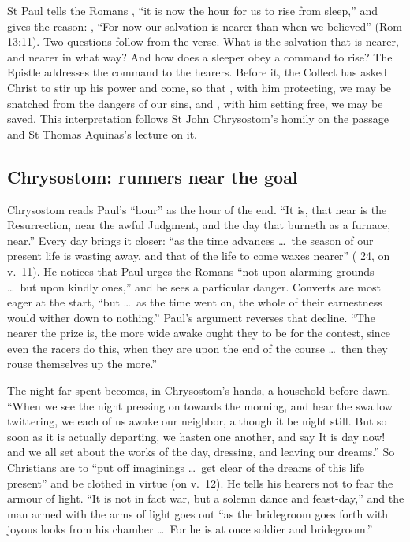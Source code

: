 
St Paul tells the Romans , ``it is
now the hour for us to rise from sleep,'' and gives the reason: , ``For now our salvation
is nearer than when we believed'' (Rom 13:11). Two questions follow from the
verse. What is the salvation that is nearer, and nearer in what way? And how
does a sleeper obey a command to rise? The Epistle addresses the command to
the hearers. Before it, the Collect has asked Christ to stir up his power and
come, so that , with him protecting, we may be snatched
from the dangers of our sins, and , with him setting
free, we may be saved. This interpretation follows St John Chrysostom's
homily on the passage and St Thomas Aquinas's lecture on it.

\subsection{Chrysostom: runners near the goal}

Chrysostom reads Paul's ``hour'' as the hour of the end. ``It is, that near is
the Resurrection, near the awful Judgment, and the day that burneth as a
furnace, near.'' Every day brings it closer: ``as the time advances \dots\ the
season of our present life is wasting away, and that of the life to come
waxes nearer'' ( 24, on v.~11). He notices that Paul
urges the Romans ``not upon alarming grounds \dots\ but upon kindly ones,'' and
he sees a particular danger. Converts are most eager at the start, ``but \dots\
as the time went on, the whole of their earnestness would wither down to
nothing.'' Paul's argument reverses that decline. ``The nearer the prize is,
the more wide awake ought they to be for the contest, since even the racers do
this, when they are upon the end of the course \dots\ then they rouse
themselves up the more.''

The night far spent becomes, in Chrysostom's hands, a household before dawn.
``When we see the night pressing on towards the morning, and hear the swallow
twittering, we each of us awake our neighbor, although it be night still. But
so soon as it is actually departing, we hasten one another, and say It is day
now! and we all set about the works of the day, dressing, and leaving our
dreams.'' So Christians are to ``put off imaginings \dots\ get clear of the
dreams of this life present'' and be clothed in virtue (on v.~12). He tells his
hearers not to fear the armour of light. ``It is not in fact war, but a solemn dance
and feast-day,'' and the man armed with the arms of light goes out ``as the
bridegroom goes forth with joyous looks from his chamber \dots\ For he is at
once soldier and bridegroom.''

